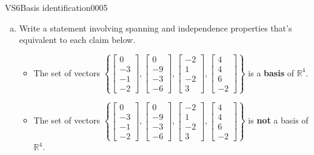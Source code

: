 \begin{exercise}{VS6}{Basis identification}{0005} 
\begin{exerciseStatement} 

\begin{enumerate}[(a)]
\item  

 Write a statement involving spanning and independence properties that's equivalent to each claim below. 

 

\begin{itemize}
\item  

 The set of vectors \(\left\{ \left[\begin{array}{c}
0 \\
-3 \\
-1 \\
-2
\end{array}\right] , \left[\begin{array}{c}
0 \\
-9 \\
-3 \\
-6
\end{array}\right] , \left[\begin{array}{c}
-2 \\
1 \\
-2 \\
3
\end{array}\right] , \left[\begin{array}{c}
4 \\
4 \\
6 \\
-2
\end{array}\right] \right\}\) is a \textbf{basis} of \(\mathbb{R}^4\). 

 
\item  

 The set of vectors \(\left\{ \left[\begin{array}{c}
0 \\
-3 \\
-1 \\
-2
\end{array}\right] , \left[\begin{array}{c}
0 \\
-9 \\
-3 \\
-6
\end{array}\right] , \left[\begin{array}{c}
-2 \\
1 \\
-2 \\
3
\end{array}\right] , \left[\begin{array}{c}
4 \\
4 \\
6 \\
-2
\end{array}\right] \right\}\) is \textbf{not} a basis of \(\mathbb{R}^4\). 


\end{itemize}
\end{enumerate}
\end{exerciseStatement}
\end{exercise}
